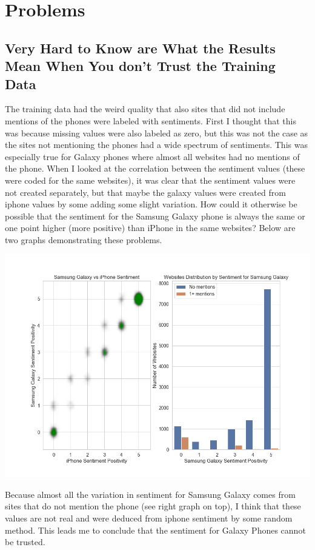 \documentclass[12pt,a4paper,leqno]{report}
\theoremstyle{plain}
\theoremstyle{definition}
\theoremstyle{remark}
\begin{document}
\section{Problems}

\subsection{Very Hard to Know are What the Results Mean When You don't Trust the Training Data}

The training data had the weird quality that also sites that did not include mentions of
the phones were labeled with sentiments. First I thought that this was because missing values
were also labeled as zero, but this was not the case as the sites not mentioning the phones
had a wide spectrum of sentiments. This was especially true for Galaxy phones where almost
all websites had no mentions of the phone. When I looked at the correlation between the
sentiment values (these were coded for the same websites), it was clear that the sentiment
values were not created separately, but that maybe the galaxy values were created from iphone
values by some adding some slight variation. How could it otherwise be possible that
the sentiment for the Samsung Galaxy phone is always the same or one point higher (more positive)
than iPhone in the same websites? Below are two graphs demonstrating these problems.

{
    \centering
    \includegraphics[width=\textwidth,height=\textheight,keepaspectratio]{training_data_problems.png}
    \par
}

Because almost all the variation in sentiment for Samsung Galaxy comes from
sites that do not mention the phone (see right graph on top), I think that these values are not
real and were deduced from iphone sentiment by some random method. This leads me to conclude
that the sentiment for Galaxy Phones cannot be trusted.
\end{document}
